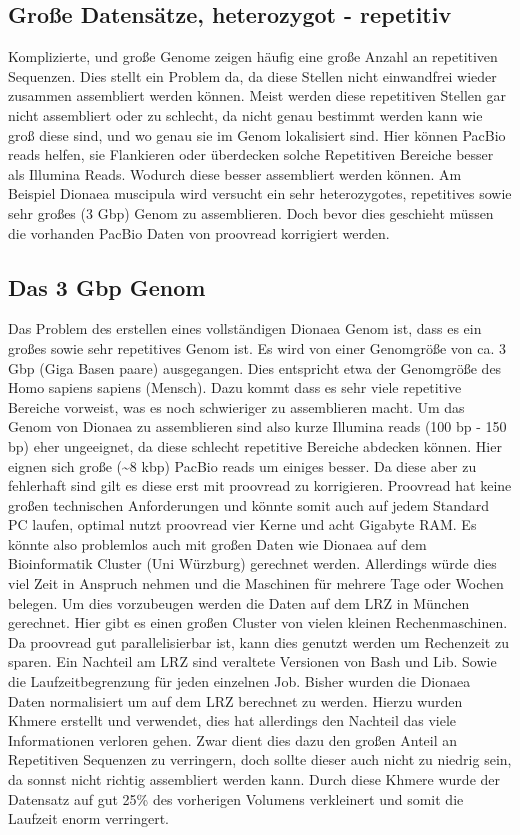 \documentclass{scrartcl}
\begin{document}
\subsection{Große Datensätze, heterozygot - repetitiv}
\label{sec-6-1}
Komplizierte, und große Genome zeigen häufig eine große Anzahl an repetitiven Sequenzen. Dies stellt ein Problem da, da diese Stellen nicht einwandfrei wieder 
zusammen assembliert werden können. Meist werden diese repetitiven Stellen gar nicht assembliert oder zu schlecht, da nicht genau bestimmt werden kann wie groß diese sind, und wo 
genau sie im Genom lokalisiert sind. Hier können PacBio reads helfen, sie Flankieren oder überdecken solche Repetitiven Bereiche besser als Illumina Reads. 
Wodurch diese besser assembliert werden können. 
Am Beispiel Dionaea muscipula wird versucht ein sehr heterozygotes, repetitives sowie sehr großes (3 Gbp) Genom zu assemblieren. Doch bevor dies geschieht müssen
die vorhanden PacBio Daten von proovread korrigiert werden. 

\subsection{Das 3 Gbp Genom}
\label{sec-6-2}
Das Problem des erstellen eines vollständigen Dionaea Genom ist, dass es ein großes sowie sehr repetitives Genom ist. Es wird von einer Genomgröße 
von ca. 3 Gbp (Giga Basen paare) ausgegangen. Dies entspricht etwa der Genomgröße des Homo sapiens sapiens (Mensch). Dazu kommt dass es sehr viele repetitive
Bereiche vorweist, was es noch schwieriger zu assemblieren macht. Um das Genom von Dionaea zu assemblieren sind also kurze Illumina reads (100 bp - 150 bp)
eher ungeeignet, da diese schlecht repetitive Bereiche abdecken können. Hier eignen sich große (\textasciitilde{}8 kbp) PacBio reads um einiges besser. Da diese aber zu fehlerhaft
sind gilt es diese erst mit proovread zu korrigieren. 
Proovread hat keine großen technischen Anforderungen und könnte somit auch auf jedem Standard PC laufen, optimal nutzt proovread vier Kerne und acht Gigabyte RAM.
Es könnte also problemlos auch mit großen Daten wie Dionaea auf dem Bioinformatik Cluster (Uni Würzburg) gerechnet werden. Allerdings würde dies viel Zeit in Anspruch 
nehmen und die Maschinen für mehrere Tage oder Wochen belegen. Um dies vorzubeugen werden die Daten auf dem LRZ in München gerechnet. Hier gibt es einen großen 
Cluster von vielen kleinen Rechenmaschinen. Da proovread gut parallelisierbar ist, kann dies genutzt werden um Rechenzeit zu sparen. Ein Nachteil am LRZ sind 
veraltete Versionen von Bash und Lib. Sowie die Laufzeitbegrenzung für jeden einzelnen Job. 
Bisher wurden die Dionaea Daten normalisiert um auf dem LRZ berechnet zu werden. Hierzu wurden Khmere erstellt und verwendet, dies hat allerdings den Nachteil
das viele Informationen verloren gehen. Zwar dient dies dazu den großen Anteil an Repetitiven Sequenzen zu verringern, doch sollte dieser auch nicht zu niedrig sein, da
sonnst nicht richtig assembliert werden kann. Durch diese Khmere wurde der Datensatz auf gut 25\% des vorherigen Volumens verkleinert und somit die Laufzeit enorm
verringert.  
\end{document}

